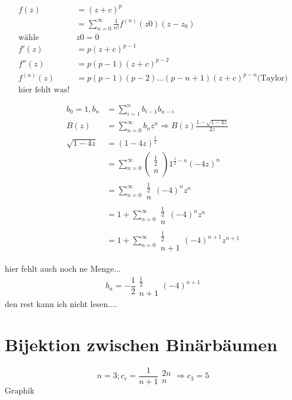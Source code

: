 \documentclass[a4paper,draft,twoside,10pt]{report}
\begin{document}
\begin{align*}
f(z) &=(z+c)^p \\
&=\sum_{n=0}^\infty \frac{1}{n!}f^{(n)}(z0)(z-z_0)\\
\mbox{wähle }&z0=0\\
f'(z)&=p(z+c)^{p-1}\\
f''(z)&=p(p-1)(z+c)^{p-2}\\
f^{(n)}(z)&=p(p-1)(p-2)\hdots(p-n+1)(z+c)^{p-n}\mbox{(Taylor)}\\
\mbox{hier fehlt was!}
\end{align*}

\begin{align*}
b_0=1,b_n&=\sum_{i=1}^nb_{i-1}b_{n-i}\\
B(z)&=\sum_{n=0}^\infty b_nz^n\Rightarrow B(z)\frac{1-\sqrt{1-4z}}{2z}\\
\sqrt{1-4z}&=(1-4z)^\frac{1}{2}\\
&=\sum_{n=0}^\infty \left(\begin{array}{c}\frac{1}{2}\\n\end{array}\right)1^{\frac{1}{2}-n}(-4z)^n\\
&=\sum_{n=0}^\infty\begin{array}{c}\frac{1}{2}\\n\end{array}(-4)^nz^n\\
&=1+\sum_{n=0}^\infty \begin{array}{c}\frac{1}{2}\\n\end{array}(-4)^nz^n\\
&=1+\sum_{n=0}^\infty \begin{array}{c}\frac{1}{2}\\n+1\end{array}(-4)^{n+1}z^{n+1}
\end{align*}

hier fehlt auch noch ne Menge...
\[b_n=-\frac{1}{2}\begin{array}{c} \frac{1}{2} \\n+1\end{array}(-4)^{n+1}\]
den rest kann ich nicht lesen....

\section{Bijektion zwischen Binär\-bäumen}
\[n=3; c_c=\frac{1}{n+1}\begin{array}{c} 2n\\n\end{array}\Rightarrow c_3=5\]
Graphik
\end{document}
